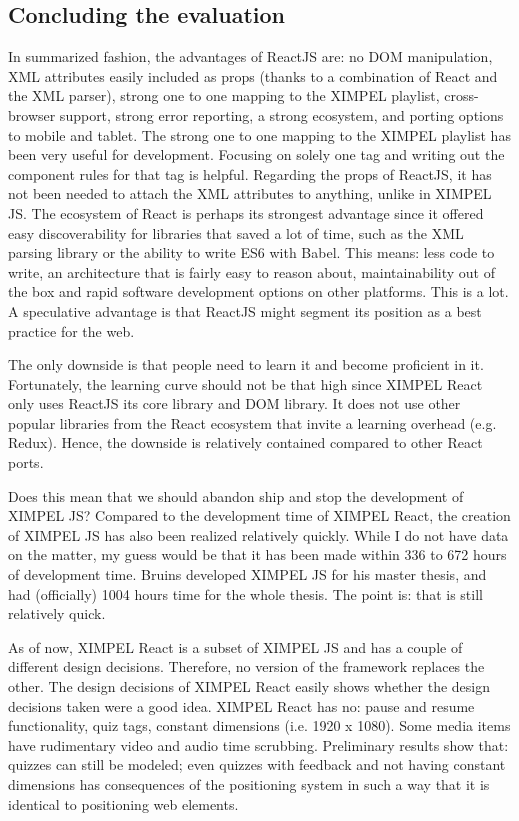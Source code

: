 \subsection{Concluding the evaluation}
In summarized fashion, the advantages of ReactJS are: no DOM manipulation, XML attributes easily included as props (thanks to a combination of React and the XML parser), strong one to one mapping to the XIMPEL playlist, cross-browser support, strong error reporting, a strong ecosystem, and porting options to mobile and tablet. The strong one to one mapping to the XIMPEL playlist has been very useful for development. Focusing on solely one tag and writing out the component rules for that tag is helpful. Regarding the props of ReactJS, it has not been needed to attach the XML attributes to anything, unlike in XIMPEL JS. The ecosystem of React is perhaps its strongest advantage since it offered easy discoverability for libraries that saved a lot of time, such as the XML parsing library or the ability to write ES6 with Babel. This means: less code to write, an architecture that is fairly easy to reason about, maintainability out of the box and rapid software development options on other platforms. This is a lot. A speculative advantage is that ReactJS might segment its position as a best practice for the web. 

The only downside is that people need to learn it and become proficient in it. Fortunately, the learning curve should not be that high since XIMPEL React only uses ReactJS its core library and DOM library. It does not use other popular libraries from the React ecosystem that invite a learning overhead (e.g. Redux). Hence, the downside is relatively contained compared to other React ports.

Does this mean that we should abandon ship and stop the development of XIMPEL JS? Compared to the development time of XIMPEL React, the creation of XIMPEL JS has also been realized relatively quickly. While I do not have data on the matter, my guess would be that it has been made within 336 to 672 hours of development time. Bruins developed XIMPEL JS for his master thesis, and had (officially) 1004 hours time for the whole thesis. The point is: that is still relatively quick. 

As of now, XIMPEL React is a subset of XIMPEL JS and has a couple of different design decisions. Therefore, no version of the framework replaces the other. The design decisions of XIMPEL React easily shows whether the design decisions taken were a good idea. XIMPEL React has no: pause and resume functionality, quiz tags, constant dimensions (i.e. 1920 x 1080). Some media items have rudimentary video and audio time scrubbing. Preliminary results show that: quizzes can still be modeled; even quizzes with feedback and not having constant dimensions has consequences of the positioning system in such a way that it is identical to positioning web elements. 

